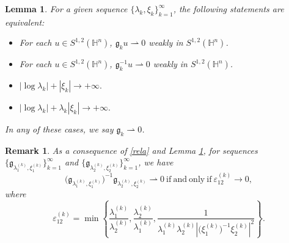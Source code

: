 \documentclass[11pt]{article}
\newtheorem{lemma}{Lemma}[section]
\newtheorem{remark}{Remark}[section]
\begin{document}
\begin{lemma}\cite[Lemma 9.13]{TF07}\label{gg}
For a given sequence $\{\lambda_k,\xi_k \}_{k=1}^{\infty}$, the following statements are equivalent:
  \begin{itemize}
    \item For each $u\in S^{1,2}(\mathbb{H}^{n})$, $\mathfrak{g}_k u\rightharpoonup 0$ weakly in $S^{1,2}(\mathbb{H}^{n})$.
    \item For each $u\in S^{1,2}(\mathbb{H}^{n})$, $\mathfrak{g}_k^{-1} u\rightharpoonup 0$ weakly in $S^{1,2}(\mathbb{H}^{n})$.
    \item $|\log \lambda_k| +|\xi_k| \to +\infty.$
    \item $|\log \lambda_k| +\lambda_k |\xi_k| \to +\infty.$
  \end{itemize}
   In any of these cases, we say $\mathfrak{g}_k \rightharpoonup 0$.
\end{lemma}
\begin{remark}\label{iff}
As a consequence of \eqref{rela} and Lemma \ref{gg}, for sequences $\big\{\mathfrak{g}_{\lambda_1^{(k)}, \xi_1^{(k)}}\big\}_{k=1}^{\infty}$ and $\big\{\mathfrak{g}_{\lambda_2^{(k)}, \xi_2^{(k)}}\big\}_{k=1}^{\infty}$, we have
 \begin{equation*}
 \Big(\mathfrak{g}_{\lambda_1^{(k)}, \xi_1^{(k)}}\Big)^{-1}\mathfrak{g}_{\lambda_2^{(k)}, \xi_2^{(k)}} \rightharpoonup 0  ~ \mathrm{if ~ and ~ only ~ if} ~ \varepsilon_{12}^{(k)}\to 0,
\end{equation*}
where
\begin{equation*}
 \varepsilon_{12}^{(k)}= \min\left\{\frac{\lambda_1^{(k)}}{\lambda_2^{(k)}},\frac{\lambda_2^{(k)}}{\lambda_1^{(k)}},
  \frac{1}{\lambda_1^{(k)}\lambda_2^{(k)}|\big(\xi_1^{(k)}\big)^{-1} \xi_2^{(k)}|^2}\right\}.
\end{equation*}
\end{remark}
\end{document}
